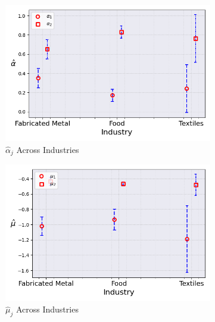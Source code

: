 \documentclass{article}
\begin{document}
\begin{figure}[ht!]
    \centering 
    \caption{I.I.D Normal Model Across Industries ($M_0 = 2$)}
    \begin{subfigure}[t]{0.32\textwidth}
        \centering
        \includegraphics[width=\textwidth]{figure/stationary_normal_alpha_across_industries_m2.png}
        \caption{$\hat\alpha_j$ Across Industries}
    \end{subfigure}
    \begin{subfigure}[t]{0.32\textwidth}
        \centering
        \includegraphics[width=\textwidth]{figure/stationary_normal_mu_across_industries_m2.png}
        \caption{$\hat\mu_j$ Across Industries}
    \end{subfigure}
    \begin{subfigure}[t]{0.32\textwidth}
        \centering

\end{subfigure}
\end{figure}
\end{document}
